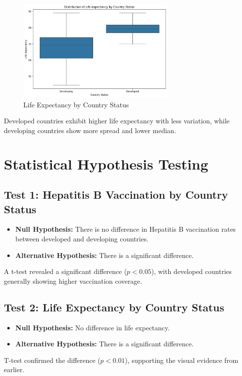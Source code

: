 \documentclass[11pt]{article}
\begin{document}
\begin{figure}[H]
    \centering
    \includegraphics[width=0.7\textwidth]{output3.png}
    \caption{Life Expectancy by Country Status}
\end{figure}

Developed countries exhibit higher life expectancy with less variation, while developing countries show more spread and lower median.

\section{Statistical Hypothesis Testing}

\subsection{Test 1: Hepatitis B Vaccination by Country Status}
\begin{itemize}
    \item \textbf{Null Hypothesis:} There is no difference in Hepatitis B vaccination rates between developed and developing countries.
    \item \textbf{Alternative Hypothesis:} There is a significant difference.
\end{itemize}
A t-test revealed a significant difference ($p < 0.05$), with developed countries generally showing higher vaccination coverage.

\subsection{Test 2: Life Expectancy by Country Status}
\begin{itemize}
    \item \textbf{Null Hypothesis:} No difference in life expectancy.
    \item \textbf{Alternative Hypothesis:} There is a significant difference.
\end{itemize}
T-test confirmed the difference ($p < 0.01$), supporting the visual evidence from earlier.
\end{document}

